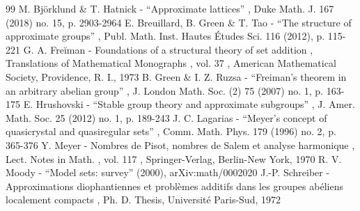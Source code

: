 \begin{thebibliography}{99}
 M. Björklund \& T. Hatnick - “Approximate lattices” , Duke Math. J. 167 (2018) no. 15, p. 2903-2964
 E. Breuillard, B. Green \& T. Tao - “The structure of approximate groups” , Publ. Math. Inst. Hautes Études Sci. 116 (2012), p. 115-221
 G. A. Freĭman - Foundations of a structural theory of set addition , Translations of Mathematical Monographs , vol. 37 , American Mathematical Society, Providence, R. I., 1973
 B. Green \& I. Z. Ruzsa - “Freiman’s theorem in an arbitrary abelian group” , J. London Math. Soc. (2) 75 (2007) no. 1, p. 163-175
 E. Hrushovski - “Stable group theory and approximate subgroups” , J. Amer. Math. Soc. 25 (2012) no. 1, p. 189-243
 J. C. Lagarias - “Meyer’s concept of quasicrystal and quasiregular sets” , Comm. Math. Phys. 179 (1996) no. 2, p. 365-376
 Y. Meyer - Nombres de Pisot, nombres de Salem et analyse harmonique , Lect. Notes in Math. , vol. 117 , Springer-Verlag, Berlin-New York, 1970
 R. V. Moody - “Model sets: survey” (2000), arXiv:math/0002020
 J.-P. Schreiber - Approximations diophantiennes et problèmes additifs dans les groupes abéliens localement compacts , Ph. D. Thesis, Université Paris-Sud, 1972
\end{thebibliography}
